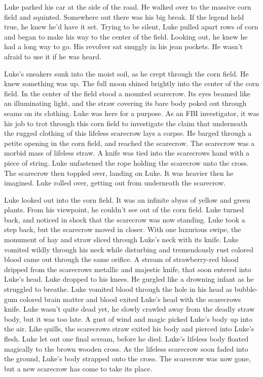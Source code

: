 Luke parked his car at the side of the road. He walked over to the
massive corn field and squinted. Somewhere out there was his big
break. If the legend held true, he knew he'd have it set. Trying to
be silent, Luke pulled apart rows of corn and began to make his way
to the center of the field. Looking out, he knew he had a long way
to go. His revolver sat snuggly in his jean pockets. He wasn't
afraid to use it if he was heard.

Luke's sneakers sunk into the moist soil, as he crept through the
corn field. He knew something was up. The full moon shined brightly
into the center of the corn field. In the center of the field stood
a mounted scarecrow. Its eyes beamed like an illuminating light,
and the straw covering its bare body poked out through seams on its
clothing. Luke was here for a purpose. As an FBI investigator, it
was his job to trot through this corn field to investigate the
claim that underneath the rugged clothing of this lifeless
scarecrow lays a corpse. He barged through a petite opening in the
corn field, and reached the scarecrow. The scarecrow was a morbid
mass of lifeless straw. A knife was tied into the scarecrows hand
with a piece of string. Luke unfastened the rope holding the
scarecrow unto the cross. The scarecrow then toppled over, landing
on Luke. It was heavier then he imagined. Luke rolled over, getting
out from underneath the scarecrow.

Luke looked out into the corn field. It was an infinite abyss of
yellow and green plants. From his viewpoint, he couldn't see out of
the corn field. Luke turned back, and noticed in shock that the
scarecrow was now standing. Luke took a step back, but the
scarecrow moved in closer. With one luxurious swipe, the monument
of hay and straw sliced through Luke's neck with its knife. Luke
vomited wildly through his neck while disturbing and tremendously
rust colored blood came out through the same orifice. A stream of
strawberry-red blood dripped from the scarecrows metallic and
majestic knife, that soon entered into Luke's head. Luke dropped to
his knees. He gurgled like a drowning infant as he struggled to
breathe. Luke vomited blood through the hole in his head as
bubble-gum colored brain matter and blood exited Luke's head with
the scarecrows knife. Luke wasn't quite dead yet, he slowly crawled
away from the deadly straw body, but it was too late. A gust of
wind and magic picked Luke's body up into the air. Like quills, the
scarecrows straw exited his body and pierced into Luke's flesh.
Luke let out one final scream, before he died. Luke's lifeless body
floated magically to the brown wooden cross. As the lifeless
scarecrow soon faded into the ground, Luke's body strapped onto the
cross. The scarecrow was now gone, but a new scarecrow has come to
take its place. 
 



